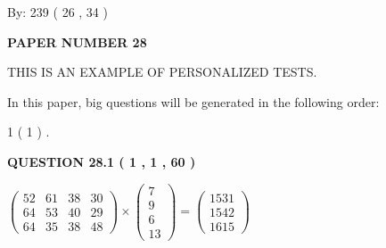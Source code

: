 \documentclass[12pt]{article}
\begin{document}
   
\hspace{1.0in} By: 
         239 (          26 ,           34 )
   
   
   
   
\newpage 
\setcounter{page}{ 
    28001 } 
   
   
   
   
 {\textbf{ \Large{ PAPER NUMBER           28  }}}
   
   
\vspace{0.2in}
   
   
   
   
   
   
 \vspace{0.2in}
{\Huge  THIS IS AN EXAMPLE OF}
{\Huge  PERSONALIZED TESTS. }
   
   
   
\vspace{0.2in}
   
In this paper, big questions will be generated in the following order: 
   
   
             1 (           1 )
 .
  
\vspace{0.2in}
  
{\textbf{\Large{QUESTION
28.1 
 (           1 ,           1 ,          60 )
}}}
  
  
 
 
\noindent{}

 
$\left( \begin{array}{ccccccccccccccc}
          52  & 
          61  & 
          38  & 
          30  \\ 
          64  & 
          53  & 
          40  & 
          29  \\ 
          64  & 
          35  & 
          38  & 
          48
\end{array}\right) \times
\left( \begin{array}{c}
           7  \\ 
           9  \\ 
           6  \\ 
          13
\end{array}\right)  =
\left( \begin{array}{c}
        1531  \\ 
        1542  \\ 
        1615
\end{array}\right)  $
 
\end{document}
